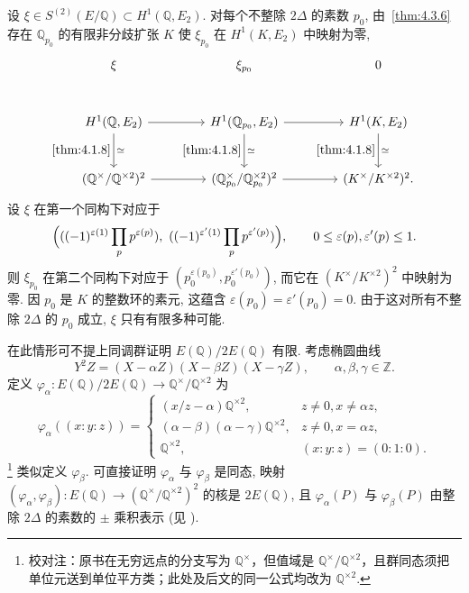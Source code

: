设 $\xi\in S^{(2)}(E/\mathbb{Q})\subset H^1(\mathbb{Q}, E_2)$. 对每个不整除 $2\Delta$ 的素数 $p_0$, 由~\ref{thm:4.3.6} 存在 $\mathbb{Q}_{p_0}$ 的有限非分歧扩张 $K$ 使 $\xi_{p_0}$ 在 $H^1(K, E_2)$ 中映射为零,
\[
\begin{tikzcd}[row sep=large, column sep=1.5cm]
    \xi & \xi_{p_0} & 0 \\
    H^1(\mathbb{Q}, E_2) \arrow[r] \arrow[d, "{\ref{thm:4.1.8}}"', "\simeq"] & 
    H^1(\mathbb{Q}_{p_0}, E_2) \arrow[r] \arrow[d, "{\ref{thm:4.1.8}}"', "\simeq"] & 
    H^1(K, E_2) \arrow[d, "{\ref{thm:4.1.8}}"', "\simeq"] \\
    (\mathbb{Q}^\times / \mathbb{Q}^{\times 2})^2 \arrow[r] & 
    (\mathbb{Q}_{p_0}^\times / \mathbb{Q}_{p_0}^{\times 2})^2 \arrow[r] & 
    (K^\times / K^{\times 2})^2.
\end{tikzcd}
\]
设 $\xi$ 在第一个同构下对应于
\[
\Bigl(((-1)^{\varepsilon(1)}\prod_p p^{\varepsilon(p)}), \ ((-1)^{\varepsilon'(1)}\prod_p p^{\varepsilon'(p)})\Bigr), \qquad 0\le\varepsilon(p), \varepsilon'(p)\le 1.
\]
则 $\xi_{p_0}$ 在第二个同构下对应于 $(p_0^{\varepsilon(p_0)}, p_0^{\varepsilon'(p_0)})$, 而它在 $(K^{\times}/K^{\times2})^2$ 中映射为零. 因 $p_0$ 是 $K$ 的整数环的素元, 这蕴含 $\varepsilon(p_0) = \varepsilon'(p_0) = 0$. 由于这对所有不整除 $2\Delta$ 的 $p_0$ 成立, $\xi$ 只有有限多种可能.

\begin{remark} \label{thm:4.3.7} 
在此情形可不提上同调群证明 $E(\mathbb{Q})/2E(\mathbb{Q})$ 有限. 考虑椭圆曲线
\[
Y^2Z = (X-\alpha Z)(X-\beta Z)(X-\gamma Z), \qquad \alpha, \beta, \gamma\in\mathbb{Z}.
\]
定义 $\varphi_\alpha\colon E(\mathbb{Q})/2E(\mathbb{Q})\to\mathbb{Q}^{\times}/\mathbb{Q}^{\times2}$ 为
\[
\varphi_\alpha((x:y:z)) = \begin{cases}
(x/z - \alpha)\mathbb{Q}^{\times2}, & z\neq 0, x\neq\alpha z,\\
(\alpha-\beta)(\alpha-\gamma)\mathbb{Q}^{\times2}, & z\neq 0, x = \alpha z,\\
\mathbb{Q}^{\times2}, & (x:y:z) = (0:1:0).
\end{cases}
\]
\footnote{校对注：原书在无穷远点的分支写为 $\mathbb{Q}^{\times}$，但值域是 $\mathbb{Q}^{\times}/\mathbb{Q}^{\times2}$，且群同态须把单位元送到单位平方类；此处及后文的同一公式均改为 $\mathbb{Q}^{\times2}$.} 类似定义 $\varphi_\beta$. 可直接证明 $\varphi_\alpha$ 与 $\varphi_\beta$ 是同态, 映射 $(\varphi_\alpha, \varphi_\beta)\colon E(\mathbb{Q})\to(\mathbb{Q}^{\times}/\mathbb{Q}^{\times2})^2$ 的核是 $2E(\mathbb{Q})$, 且 $\varphi_\alpha(P)$ 与 $\varphi_\beta(P)$ 由整除 $2\Delta$ 的素数的 $\pm$ 乘积表示 (见 \cite[Chap. 15]{cassels1991}).
\end{remark}

